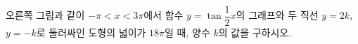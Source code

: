 \noindent\begin{minipage}[t]{0.58\linewidth}\vspace{0pt}\raggedright 오른쪽 그림과 같이 $-\pi<x<3\pi$에서 함수 $y=\tan\dfrac{1}{2}x$의 그래프와 두 직선 $y=2k$, $y=-k$로 둘러싸인 도형의 넓이가 $18\pi$일 때, 양수 $k$의 값을 구하시오.\end{minipage}\hfill\begin{minipage}[t]{0.4\linewidth}\vspace{0pt}\centering \resizebox{\ifdim\width>\linewidth\linewidth\else\width\fi}{!}{}\end{minipage}\par
